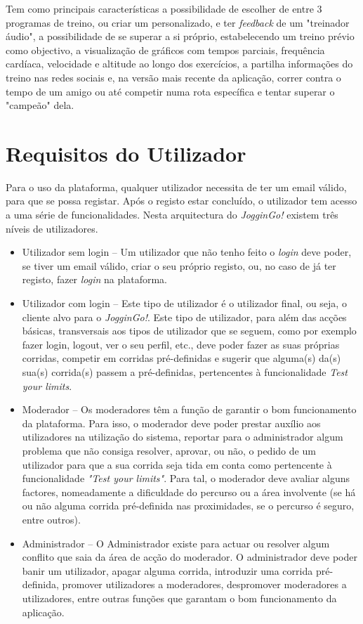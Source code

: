 \documentclass[twocolumn,twoside,10pt,a4paper]{article}
\begin{document}
Tem como principais características a possibilidade de escolher de entre 3 programas de treino, ou criar um personalizado, e ter \textit{feedback} de um "treinador áudio", a possibilidade de se superar a si próprio, estabelecendo um treino prévio como objectivo, a visualização de gráficos com tempos parciais, frequência cardíaca, velocidade e altitude ao longo dos exercícios, a partilha informações do treino nas redes sociais e, na versão mais recente da aplicação, correr contra o tempo de um amigo ou até competir numa rota específica e tentar superar o "campeão" dela.

\section{Requisitos do Utilizador}\label{sec:application}

Para o uso da plataforma, qualquer utilizador necessita de ter um email válido, para que se possa registar. Após o registo estar concluído, o utilizador tem acesso a uma série de funcionalidades. Nesta arquitectura do \textit{JogginGo!} existem três níveis de utilizadores.

\begin{itemize}
\item {Utilizador sem login} -- Um utilizador que não tenho feito o \textit{login} deve poder, se tiver um email válido, criar o seu próprio registo, ou, no caso de já ter registo, fazer \textit{login} na plataforma.
\item {Utilizador com login} -- Este tipo de utilizador é o utilizador final, ou seja, o cliente alvo para o \textit{JogginGo!}. Este tipo de utilizador, para além das acções básicas, transversais aos tipos de utilizador que se seguem, como por exemplo fazer login, logout, ver o seu perfil, etc., deve poder fazer as suas próprias corridas, competir em corridas pré-definidas e sugerir que alguma(s) da(s) sua(s) corrida(s) passem a pré-definidas, pertencentes à funcionalidade \textit{Test your limits}.
\item{Moderador} -- Os moderadores têm a função de garantir o bom funcionamento da plataforma. Para isso, o moderador deve poder prestar auxílio aos utilizadores na utilização do sistema, reportar para o administrador algum problema que não consiga resolver, aprovar, ou não, o pedido de um utilizador para que a sua corrida seja tida em conta como pertencente à funcionalidade \textit{"Test your limits"}. Para tal, o moderador deve avaliar alguns factores, nomeadamente a dificuldade do percurso ou a área involvente (se há ou não alguma corrida pré-definida nas proximidades, se o percurso é seguro, entre outros).
\item{Administrador} -- O Administrador existe para actuar ou resolver algum conflito que saia da área de acção do moderador. O administrador deve poder banir um utilizador, apagar alguma corrida, introduzir uma corrida pré-definida, promover utilizadores a moderadores, despromover moderadores a utilizadores, entre outras funções que garantam o bom funcionamento da aplicação.
\end{itemize}
\end{document}

